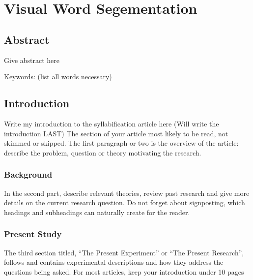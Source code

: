 
\chapter{Visual Word Segementation} %

\label{Chapter3} %

\section{Abstract}

Give abstract here

Keywords: (list all words necessary)


\section{Introduction}

Write my introduction to the syllabification article here (Will write the introduction LAST)
The section of your article most likely to be read, not skimmed or skipped. The first paragraph or two is the overview of the article: describe the problem, question or theory motivating the research. 

\subsection{Background}

In the second part, describe relevant theories, review past research and give more details on the current research question. Do not forget about signposting, which headings and subheadings can naturally create for the reader.


\subsection{Present Study}
The third section titled, “The Present Experiment” or “The Present Research”, follows and contains experimental descriptions and how they address the questions being asked.
For most articles, keep your introduction under 10 pages

